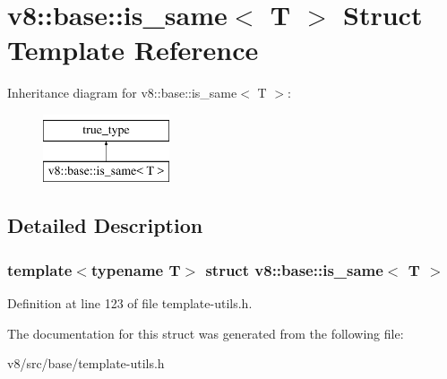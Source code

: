 \hypertarget{structv8_1_1base_1_1is__same_3_01T_01_4}{}\section{v8\+:\+:base\+:\+:is\+\_\+same$<$ T $>$ Struct Template Reference}
\label{structv8_1_1base_1_1is__same_3_01T_01_4}
Inheritance diagram for v8\+:\+:base\+:\+:is\+\_\+same$<$ T $>$\+:\begin{figure}[H]
\begin{center}
\leavevmode
\includegraphics[height=2.000000cm]{structv8_1_1base_1_1is__same_3_01T_01_4}
\end{center}
\end{figure}


\subsection{Detailed Description}
\subsubsection*{template$<$typename T$>$\newline
struct v8\+::base\+::is\+\_\+same$<$ T $>$}



Definition at line 123 of file template-\/utils.\+h.



The documentation for this struct was generated from the following file\+:\begin{DoxyCompactItemize}
\item 
v8/src/base/template-\/utils.\+h\end{DoxyCompactItemize}
